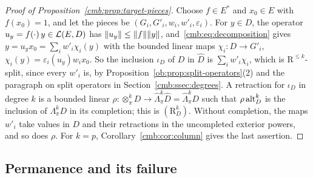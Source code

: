 \begin{proof}[Proof of Proposition~\ref{cmb:prop:target-pieces}]
Choose $f\in E^*$ and $x_0\in E$ with $f(x_0)=1$, and let the pieces be $(G_i,G'_i,w_i,w'_i,\varepsilon_i)$. For $y\in D$,
the operator $u_y=f(\cdot)\,y\in\mathcal L(E,D)$ has $\lVert u_y\rVert\le\lVert f\rVert\lVert y\rVert$, and~\eqref{cmb:eq:decomposition} gives
$y=u_yx_0=\sum_iw'_i\chi_i(y)$ with the bounded linear maps $\chi_i\colon D\to G'_i$, $\chi_i(y)=\varepsilon_i(u_y)w_ix_0$.
So the inclusion $\iota_D$ of $D$ in $\widehat D$ is $\sum_iw'_i\chi_i$, which is $\mathrm R^{\le k}$-split, since every
$w'_i$ is, by Proposition~\ref{ob:prop:split-operators}(2) and the paragraph on split operators in
Section~\ref{cmb:ssec:degrees}. A
retraction for $\iota_D$ in degree $k$ is a bounded linear
$\rho\colon\otimes^k_\pi D\to\widehat\Lambda^k_\pi\widehat D=\widehat\Lambda^k_\pi D$ such that $\rho\operatorname{alt}^k_D$ is the
inclusion of $\Lambda^k_\pi D$ in its completion; this is $(\mathrm R^k_D)$. Without completion, the maps $w'_i$ take values
in $D$ and their retractions in the uncompleted exterior powers, and so does $\rho$. For $k=p$,
Corollary~\ref{cmb:cor:column} gives the last assertion.
\end{proof}

\subsection{Permanence and its failure}\label{dgr:ssec:permanence}

